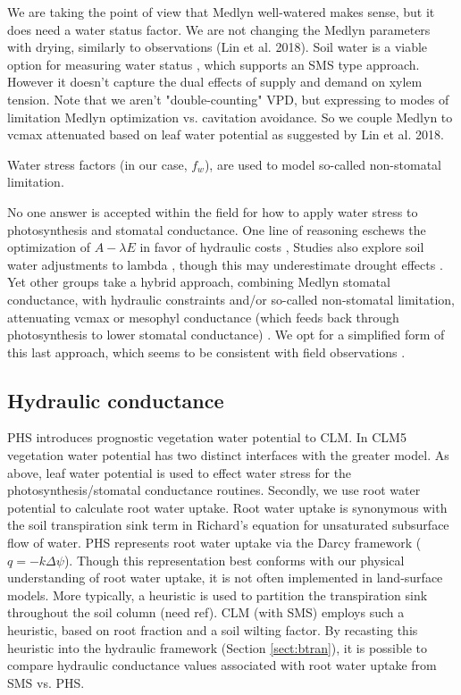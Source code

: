 \documentclass[draft,linenumbers]{agujournal}
\begin{document}
We are taking the point of view that Medlyn well-watered makes sense, but it does need a water status factor.
We are not changing the Medlyn parameters with drying, similarly to observations (Lin et al. 2018).
Soil water is a viable option for measuring water status \citep{drake2017}, which supports an SMS type approach.
However it doesn't capture the dual effects of supply and demand on xylem tension.
Note that we aren't "double-counting" VPD, but expressing to modes of limitation Medlyn optimization vs. cavitation avoidance.
So we couple Medlyn to vcmax attenuated based on leaf water potential as suggested by Lin et al. 2018.

Water stress factors (in our case, $f_w$), are used to model so-called non-stomatal limitation. 

No one answer is accepted within the field for how to apply water stress to photosynthesis and stomatal conductance.
One line of reasoning eschews the optimization of $A-\lambda E$ in favor of hydraulic costs \citep{sperry2017},
Studies also explore soil water adjustments to lambda \citep{manzoni2013b}, though this may underestimate drought effects \citep{zhou2013}.
Yet other groups take a hybrid approach, combining Medlyn stomatal conductance, with hydraulic constraints and/or 
so-called non-stomatal limitation, attenuating vcmax or mesophyl conductance
(which feeds back through photosynthesis to lower stomatal conductance) \citep{egea2011,novick2016a}.
We opt for a simplified form of this last approach, which seems to be consistent with field observations \citep{lin2018}.

\subsection{Hydraulic conductance}

PHS introduces prognostic vegetation water potential to CLM.
In CLM5 vegetation water potential has two distinct interfaces with the greater model.
As above, leaf water potential is used to effect water stress for the photosynthesis/stomatal conductance routines.
Secondly, we use root water potential to calculate root water uptake.
Root water uptake is synonymous with the soil transpiration sink term in Richard's equation for unsaturated subsurface flow of water.
PHS represents root water uptake via the Darcy framework ($q=-k\Delta\psi$).
Though this representation best conforms with our physical understanding of root water uptake, it is not often implemented in land-surface models.
More typically, a heuristic is used to partition the transpiration sink throughout the soil column (need ref).
CLM (with SMS) employs such a heuristic, based on root fraction and a soil wilting factor. 
By recasting this heuristic into the hydraulic framework (Section \ref{sect:btran}), it is possible to
compare hydraulic conductance values associated with root water uptake from SMS vs. PHS.
\end{document}
